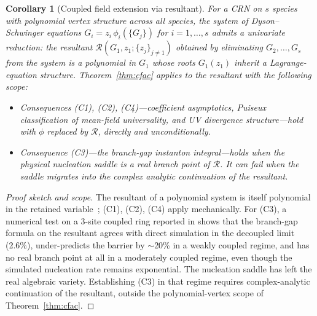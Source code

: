 \documentclass[11pt,a4paper]{article}
\theoremstyle{plain}
\newtheorem{corollary}[theorem]{Corollary}
\theoremstyle{definition}
\begin{document}
\begin{corollary}[Coupled field extension via resultant]
\label{cor:coupled}
For a CRN on $s$ species with polynomial vertex structure across
all species, the system of Dyson--Schwinger equations
$G_i = z_i\,\phi_i(\{G_j\})$ for $i = 1, \ldots, s$ admits a
univariate reduction: the resultant
$\mathcal{R}(G_1, z_1; \{z_j\}_{j \neq 1})$ obtained by
eliminating $G_2, \ldots, G_s$ from the system is a polynomial in
$G_1$ whose roots $G_1(z_1)$ inherit a Lagrange-equation
structure.  Theorem~\ref{thm:cfac} applies to the resultant with the
following scope:
\begin{itemize}[leftmargin=1.5em,itemsep=-0.1em]
\item Consequences (C1), (C2), (C4)---coefficient asymptotics,
  Puiseux classification of mean-field universality, and UV
  divergence structure---hold with $\phi$ replaced by
  $\mathcal{R}$, directly and unconditionally.
\item Consequence (C3)---the branch-gap instanton integral---holds
  when the physical nucleation saddle is a real branch point of
  $\mathcal{R}$.  It can fail when the saddle migrates into the
  complex analytic continuation of the resultant.
\end{itemize}
\end{corollary}

\begin{proof}[Proof sketch and scope]
The resultant of a polynomial system is itself polynomial in the
retained variable~\citep{CLO}; (C1), (C2), (C4) apply mechanically.
For (C3), a numerical test on a 3-site coupled ring reported
in \citep{CFACpaper} shows that the branch-gap formula on the
resultant agrees with direct simulation in the decoupled limit
(2.6\%), under-predicts the barrier by $\sim$20\% in a weakly
coupled regime, and has no real branch point at all in a
moderately coupled regime, even though the simulated nucleation
rate remains exponential.  The nucleation saddle has left the
real algebraic variety.  Establishing (C3) in that regime
requires complex-analytic continuation of the resultant, outside
the polynomial-vertex scope of Theorem~\ref{thm:cfac}.
\end{proof}
\end{document}
